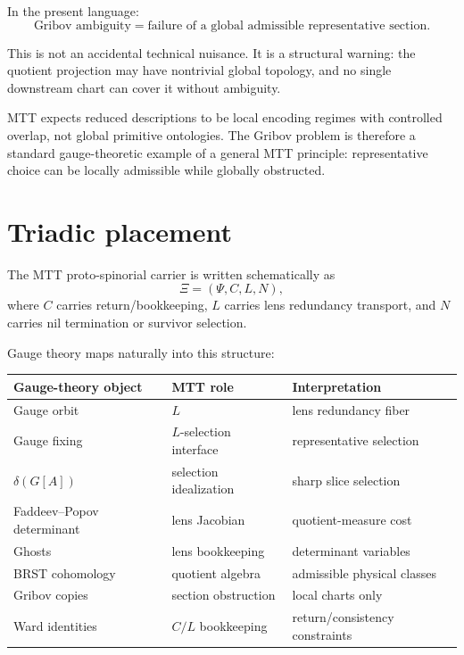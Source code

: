 \documentclass[11pt]{article}
\begin{document}
In the present language:
\[
\boxed{
\text{Gribov ambiguity}=
\text{failure of a global admissible representative section}.
}
\]

This is not an accidental technical nuisance. It is a structural warning: the quotient projection may have nontrivial global topology, and no single downstream chart can cover it without ambiguity.

\begin{remark}
MTT expects reduced descriptions to be local encoding regimes with controlled overlap, not global primitive ontologies. The Gribov problem is therefore a standard gauge-theoretic example of a general MTT principle: representative choice can be locally admissible while globally obstructed.
\end{remark}

\section{Triadic placement}

The MTT proto-spinorial carrier is written schematically as
\[
\Xi=(\Psi,C,L,N),
\]
where \(C\) carries return/bookkeeping, \(L\) carries lens redundancy transport, and \(N\) carries nil termination or survivor selection.

Gauge theory maps naturally into this structure:

\begin{center}
\begin{tabular}{p{}p{}p{}}
\hline
Gauge-theory object & MTT role & Interpretation\\
\hline
Gauge orbit & \(L\) & lens redundancy fiber\\
Gauge fixing & \(L\)-selection interface & representative selection\\
\(\delta(G[A])\) & selection idealization & sharp slice selection\\
Faddeev--Popov determinant & lens Jacobian & quotient-measure cost\\
Ghosts & lens bookkeeping & determinant variables\\
BRST cohomology & quotient algebra & admissible physical classes\\
Gribov copies & section obstruction & local charts only\\
Ward identities & \(C/L\) bookkeeping & return/consistency constraints\\
\hline
\end{tabular}
\end{center}
\end{document}
